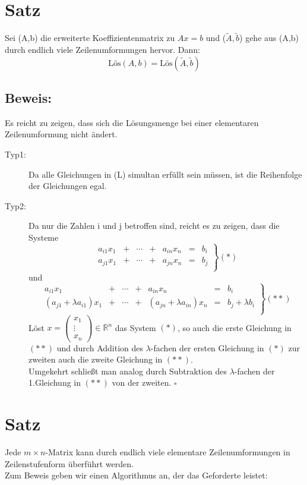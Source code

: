 \documentclass{scrbook}
\begin{document}
\section{Satz}
Sei (A,b) die erweiterte Koeffizientenmatrix zu \(Ax=b\) und (\(\tilde{A},\tilde{b}\)) gehe aus (A,b) durch endlich viele Zeilenumformungen hervor. Dann:
\[
\text{Lös}(A,b)=\text{Lös}(\tilde{A},\tilde{b})
\]
\subsection*{Beweis:}
Es reicht zu zeigen, dass sich die Lösungsmenge bei einer elementaren Zeilenumformung nicht ändert.
\begin{description}
\item[Typ1:]
Da alle Gleichungen in (L) simultan erfüllt sein müssen, ist die Reihenfolge der Gleichungen egal.
\item[Typ2:]
Da nur die Zahlen i und j betroffen sind, reicht es zu zeigen, dass die Systeme
\[
\left.
\begin{array}{rcccrcc}
a_{i1}x_1&+&\cdots &+ &a_{in} x_n &=&b_i\\
a_{j1}x_1&+&\cdots &+ &a_{jn} x_n &=&b_j\\
\end{array}
\right\} (*)
\]
und
\[
\left.
\begin{array}{rcccrcc}
a_{i1}x_1&+&\cdots &+ &a_{in} x_n &=&b_i\\
(a_{j1}+\lambda a_{i1})x_1&+&\cdots &+ & (a_{jn} + \lambda a_{in}) x_n &=&b_j + \lambda b_i\\
\end{array}
\right\} (**)
\]
Löst \(x= \left(\begin{array}{c}
x_1\\
\vdots\\
x_n
\end{array}\right)
\in \mathbb{R}^n
\) das System \((*)\), so auch die erste Gleichung in \((**)\) und durch Addition des \(\lambda\)-fachen der ersten Gleichung in \((*)\) zur zweiten auch die zweite Gleichung in \((**)\).\\
Umgekehrt schließt man analog durch Subtraktion des \(\lambda\)-fachen der 1.Gleichung in \((**)\) von der zweiten. \(\square\)
\end{description}
\section{Satz}
Jede \(m\times n\)-Matrix kann durch endlich viele elementare Zeilenumformungen in Zeilenstufenform überführt werden.\\
Zum Beweis geben wir einen Algorithmus an, der das Geforderte leistet:\\
\end{document}
